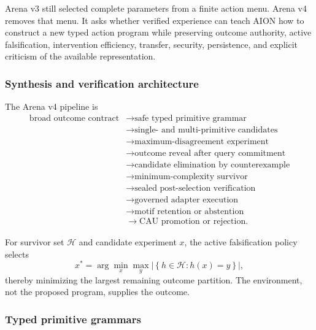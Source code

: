 Arena v3 still selected complete parameters from a finite action menu.  Arena
v4 removes that menu.  It asks whether verified experience can teach AION how
to construct a new typed action program while preserving outcome authority,
active falsification, intervention efficiency, transfer, security, persistence,
and explicit criticism of the available representation.


\subsubsection{Synthesis and verification architecture}

The Arena v4 pipeline is
\begin{equation}
\begin{split}
\text{broad outcome contract}
&\rightarrow \text{safe typed primitive grammar} \\
&\rightarrow \text{single- and multi-primitive candidates} \\
&\rightarrow \text{maximum-disagreement experiment} \\
&\rightarrow \text{outcome reveal after query commitment} \\
&\rightarrow \text{candidate elimination by counterexample} \\
&\rightarrow \text{minimum-complexity survivor} \\
&\rightarrow \text{sealed post-selection verification} \\
&\rightarrow \text{governed adapter execution} \\
&\rightarrow \text{motif retention or abstention} \\
&\rightarrow \text{CAU promotion or rejection}.
\end{split}
\label{eq:arena-v4-synthesis}
\end{equation}

For survivor set $\mathcal{H}$ and candidate experiment $x$, the active
falsification policy selects
\begin{equation}
x^{*}
=
\arg\min_{x}
\max_{y}
\left|
\left\{h\in\mathcal{H}:h(x)=y\right\}
\right|,
\label{eq:arena-v4-disagreement}
\end{equation}
thereby minimizing the largest remaining outcome partition.  The environment,
not the proposed program, supplies the outcome.


\subsubsection{Typed primitive grammars}

